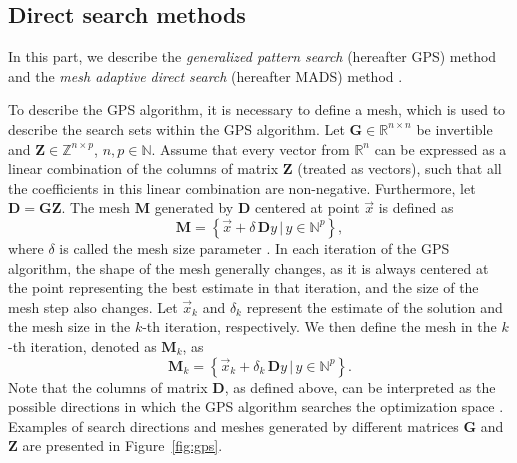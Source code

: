 \subsection{Direct search methods}\label{direct-search}
In this part, we describe the \textit{generalized pattern search} (hereafter GPS) method \cite{Audet2002} and the \textit{mesh adaptive direct search} (hereafter MADS) method \cite{Audet2006}.

To describe the GPS algorithm, it is necessary to define a mesh, which is used to describe the search sets within the GPS algorithm. Let $ \mathbf{G} \in \mathbb{R}^{n \times n} $ be invertible and $ \mathbf{Z} \in \mathbb{Z}^{n \times p} $, $n, p \in \mathbb{N}$. Assume that every vector from $ \mathbb{R}^{n} $ can be expressed as a linear combination of the columns of matrix $ \mathbf{Z} $ (treated as vectors), such that all the coefficients in this linear combination are non-negative. Furthermore, let $ \mathbf{D} = \mathbf{G} \mathbf{Z} $. The mesh $ \mathbf{M} $ generated by $ \mathbf{D} $ centered at point $ \vec{x} $ is defined as
\begin{equation}
	\mathbf{M} = \left\{ \vec{x} + \delta \, \mathbf{D} y \, | \, y \in \mathbb{N}^p \right\},
\end{equation}
where $ \delta $ is called the mesh size parameter \cite{BBO-textbook, Audet2002}. In each iteration of the GPS algorithm, the shape of the mesh generally changes, as it is always centered at the point representing the best estimate in that iteration, and the size of the mesh step also changes. Let $ \vec{x}_k $ and $ \delta_k $ represent the estimate of the solution and the mesh size in the $ k $-th iteration, respectively. We 
then define the mesh in the $ k $-th iteration, denoted as $ \mathbf{M} _k $, as
\begin{equation}
	\mathbf{M} _k = \left\{ \vec{x}_k + \delta_k \, \mathbf{D} y \, | \, y \in \mathbb{N}^p \right\}.
\end{equation}
Note that the columns of matrix $ \mathbf{D} $, as defined above, can be interpreted as the possible directions in which the GPS algorithm searches the optimization space \cite{BBO-textbook, Audet2002}. Examples of search directions and meshes generated by different matrices $\mathbf{G}$ and $\mathbf{Z}$ are presented in Figure~\ref{fig:gps}.


